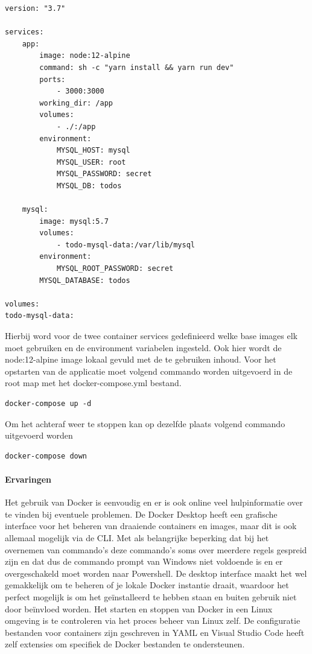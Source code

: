 \begin{lstlisting}[caption=inhoud van de docker-compose.yml,label=lst:Composefile]
version: "3.7"

services:
    app:
        image: node:12-alpine
        command: sh -c "yarn install && yarn run dev"
        ports:
            - 3000:3000
        working_dir: /app
        volumes:
            - ./:/app
        environment:
            MYSQL_HOST: mysql
            MYSQL_USER: root
            MYSQL_PASSWORD: secret
            MYSQL_DB: todos

    mysql:
        image: mysql:5.7
        volumes:
            - todo-mysql-data:/var/lib/mysql
        environment: 
            MYSQL_ROOT_PASSWORD: secret
        MYSQL_DATABASE: todos

volumes:
todo-mysql-data:
\end{lstlisting}
Hierbij word voor de twee container services gedefinieerd welke base images elk moet gebruiken en de environment variabelen ingesteld. Ook hier wordt de node:12-alpine image lokaal gevuld met de te gebruiken inhoud. Voor het opstarten van de applicatie moet volgend commando worden uitgevoerd in de root map met het docker-compose.yml bestand.
\begin{verbatim}
docker-compose up -d
\end{verbatim}
Om het achteraf weer te stoppen kan op dezelfde plaats volgend commando uitgevoerd worden
\begin{verbatim}
docker-compose down 
\end{verbatim}
\paragraph{Ervaringen}
Het gebruik van Docker is eenvoudig en er is ook online veel hulpinformatie over te vinden bij eventuele problemen. De Docker Desktop heeft een grafische interface voor het beheren van draaiende containers en images, maar dit is ook allemaal mogelijk via de CLI. Met als belangrijke beperking dat bij het overnemen van commando’s deze commando’s soms over meerdere regels gespreid zijn en dat dus de commando prompt van Windows niet voldoende is en er overgeschakeld moet worden naar Powershell. De desktop interface maakt het wel gemakkelijk om te beheren of je lokale Docker instantie draait, waardoor het perfect mogelijk is om het geïnstalleerd te hebben staan en buiten gebruik niet door beïnvloed worden. Het starten en stoppen van Docker in een Linux omgeving is te controleren via het proces beheer van Linux zelf. De configuratie bestanden voor containers zijn geschreven in YAML en Visual Studio Code heeft zelf extensies om specifiek de Docker bestanden te ondersteunen.

